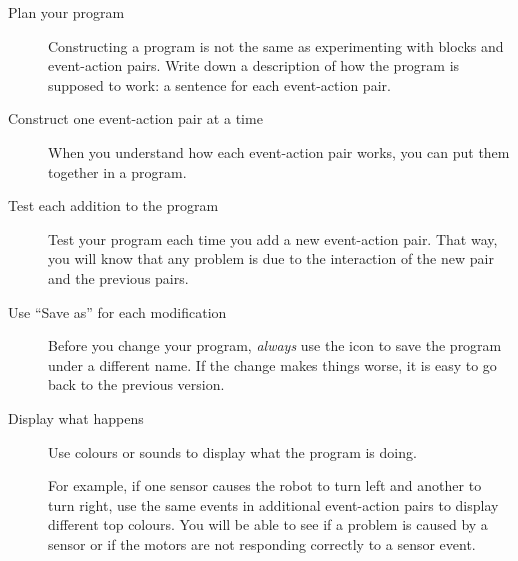 \begin{description}
\item[Plan your program]
Constructing a program is not the same as experimenting with blocks
and event-action pairs.
Write down a description of how the program is supposed to work:
a sentence for each event-action pair.

\item[Construct one event-action pair at a time]
When you understand how each
event-action pair works, you can put them together in a program.

\item[Test each addition to the program]
Test your program each time you add a new event-action pair.
That way, you will know that any problem
is due to the interaction of the new pair and the previous pairs.

\item[Use ``Save as'' for each modification]
Before you change your program, \emph{always} use the icon
 to save the program under a different name.
If the change makes things worse,
it is easy to go back to the previous version.

\item[Display what happens]
Use colours or sounds to display what the program is doing.

For example, if one sensor causes the robot to turn left and another to
turn right, use the same events in additional event-action pairs
to display different top colours.
You will be able to see if a problem is caused by a sensor or
if the motors are not responding correctly to a sensor event.

\end{description}



